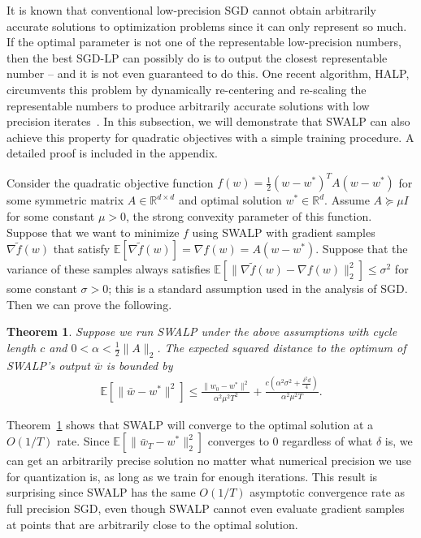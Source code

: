 \documentclass{article}
\newtheorem{theorem}{Theorem}
\begin{document}
It is known that conventional low-precision SGD cannot obtain arbitrarily accurate solutions to optimization problems since it can only represent so much.
If the optimal parameter is not one of the representable low-precision numbers, then the best SGD-LP can possibly do is to output the closest representable number -- and it is not even guaranteed to do this.
One recent algorithm, HALP, circumvents this problem by dynamically re-centering and re-scaling the representable numbers to produce arbitrarily accurate solutions with low precision iterates~\cite{HALP}.
In this subsection, we will demonstrate that SWALP can also achieve this property for quadratic objectives with a simple training procedure. 
A detailed proof is included in the appendix.

Consider the quadratic objective function
$f(w) = \frac{1}{2}(w - w^*)^T A (w - w^*)$
for some symmetric matrix $A \in \mathbb{R}^{d \times d}$ and optimal solution $w^* \in \mathbb{R}^d$.
Assume $A \succeq \mu I$ for some constant $\mu > 0$, the strong convexity parameter of this function.
Suppose that we want to minimize $f$ using SWALP with gradient samples $\nabla \tilde f(w)$ that satisfy $\mathbb{E}[\nabla \tilde f(w)] = \nabla f(w) = A (w - w^*)$.
Suppose that the variance of these samples always satisfies $\mathbb{E}[\| \nabla \tilde f(w) - \nabla f(w) \|_2^2] \le \sigma^2$ for some constant $\sigma > 0$; this is a standard assumption used in the analysis of SGD.
Then we can prove the following. 

\begin{theorem}\label{thm:quadratic}
Suppose we run SWALP under the above assumptions with cycle length $c$ and $0 < \alpha < \frac{1}{2}\|A\|_2$.
The expected squared distance to the optimum of SWALP's output $\bar{w}$ is bounded by
\begin{align*}
{\textstyle
\mathbb{E}\left[\|\bar{w} - w^*\|^2 \right]
\leq
\frac{\|w_0 - w^*\|^2}{\alpha^2\mu^2T^2} + 
\frac{c(\alpha^2\sigma^2 + \frac{\delta^2d}{4})}{\alpha^2\mu^2T}
}.\end{align*}
\end{theorem}

Theorem~\ref{thm:quadratic} shows that SWALP will converge to the optimal solution at a $O(1/T)$ rate. 
Since $\mathbb{E}[\|\bar{w}_T - w^*\|_2^2]$ converges to $0$ regardless of what $\delta$ is, we can get an arbitrarily precise solution no matter what numerical precision we use for quantization is, as long as we train for enough iterations.
This result is surprising since SWALP has the same $O(1/T)$ asymptotic convergence rate as full precision SGD, even though SWALP cannot even evaluate gradient samples at points that are arbitrarily close to the optimal solution.
\end{document}
